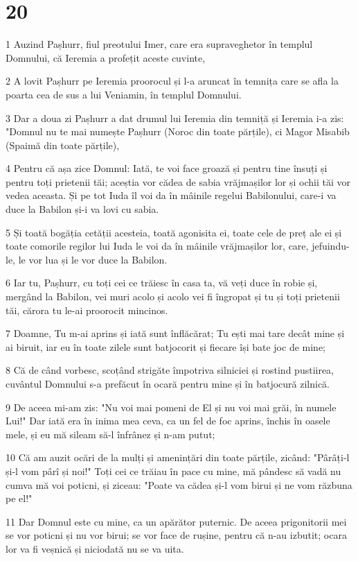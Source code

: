 \chapter{20}

\par 1 Auzind Pașhurr, fiul preotului Imer, care era supraveghetor în templul Domnului, că Ieremia a profețit aceste cuvinte,
\par 2 A lovit Pașhurr pe Ieremia proorocul și l-a aruncat în temnița care se afla la poarta cea de sus a lui Veniamin, în templul Domnului.
\par 3 Dar a doua zi Pașhurr a dat drumul lui Ieremia din temniță și Ieremia i-a zis: "Domnul nu te mai numește Pașhurr (Noroc din toate părțile), ci Magor Misabib (Spaimă din toate părțile),
\par 4 Pentru că așa zice Domnul: Iată, te voi face groază și pentru tine însuți și pentru toți prietenii tăi; aceștia vor cădea de sabia vrăjmașilor lor și ochii tăi vor vedea aceasta. Și pe tot Iuda îl voi da în mâinile regelui Babilonului, care-i va duce la Babilon și-i va lovi cu sabia.
\par 5 Și toată bogăția cetății acesteia, toată agonisita ei, toate cele de preț ale ei și toate comorile regilor lui Iuda le voi da în mâinile vrăjmașilor lor, care, jefuindu-le, le vor lua și le vor duce la Babilon.
\par 6 Iar tu, Pașhurr, cu toți cei ce trăiesc în casa ta, vă veți duce în robie și, mergând la Babilon, vei muri acolo și acolo vei fi îngropat și tu și toți prietenii tăi, cărora tu le-ai proorocit mincinos.
\par 7 Doamne, Tu m-ai aprins și iată sunt înflăcărat; Tu ești mai tare decât mine și ai biruit, iar eu în toate zilele sunt batjocorit și fiecare își bate joc de mine;
\par 8 Că de când vorbesc, scoțând strigăte împotriva silniciei și rostind pustiirea, cuvântul Domnului s-a prefăcut în ocară pentru mine și în batjocură zilnică.
\par 9 De aceea mi-am zis: "Nu voi mai pomeni de El și nu voi mai grăi, în numele Lui!" Dar iată era în inima mea ceva, ca un fel de foc aprins, închis în oasele mele, și eu mă sileam să-l înfrânez și n-am putut;
\par 10 Că am auzit ocări de la mulți și amenințări din toate părțile, zicând: "Pârâți-l și-l vom pârî și noi!" Toți cei ce trăiau în pace cu mine, mă pândesc să vadă nu cumva mă voi poticni, și ziceau: "Poate va cădea și-l vom birui și ne vom răzbuna pe el!"
\par 11 Dar Domnul este cu mine, ca un apărător puternic. De aceea prigonitorii mei se vor poticni și nu vor birui; se vor face de rușine, pentru că n-au izbutit; ocara lor va fi veșnică și niciodată nu se va uita.

